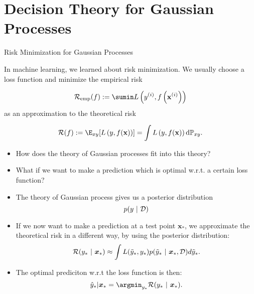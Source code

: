 \documentclass[11pt,compress,t,notes=noshow, xcolor=table]{beamer}
\begin{document}
\section{Decision Theory for Gaussian Processes}

\begin{vbframe}{Risk Minimization for Gaussian Processes}

In machine learning, we learned about risk minimization. We usually choose a loss function and minimize the empirical risk  

$$
  \riske(f) := \sumin \Lxyi
$$
as an approximation to the theoretical risk

$$ 
  \riskf := \E_{xy} [\Lxy] = \int \Lxy \text{d}\Pxy. 
$$

\begin{itemize}
  \item How does the theory of Gaussian processes fit into this theory? 
  \item What if we want to make a prediction which is optimal w.r.t. a certain loss function? 
\end{itemize}

\framebreak 

\begin{itemize}
  \item The theory of Gaussian process gives us a posterior distribution 
  $$
    p(y ~|~\mathcal{D})
  $$
  \item If we now want to make a prediction at a test point $\bm{x}_*$, we approximate the theoretical risk in a different way, by using the posterior distribution: 
  $$
    \mathcal{R}(y_* ~|~ \bm{x}_*) \approx \int L(\tilde y_*, y_*) p(\tilde y_*~|~\bm{x}_*, \mathcal{D})d\tilde y_*. 
  $$
  \item The optimal prediciton w.r.t the loss function is then: 
  $$
    \hat y_* | \bm{x}_* = \argmin_{y_*} \mathcal{R}(y_*~|~ \bm{x}_*).
  $$
\end{itemize}









\end{vbframe}
\end{document}
